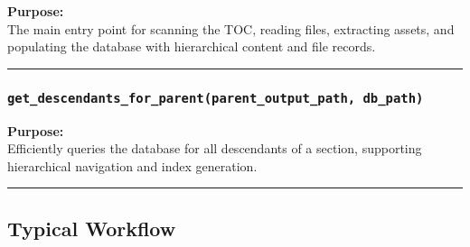 \textbf{Purpose:}\\
The main entry point for scanning the TOC, reading files, extracting
assets, and populating the database with hierarchical content and file
records.

\begin{center}\rule{0.5\linewidth}{0.5pt}\end{center}

\subsubsection{\texorpdfstring{\texttt{get\_descendants\_for\_parent(parent\_output\_path,\ db\_path)}}{get\_descendants\_for\_parent(parent\_output\_path, db\_path)}}\label{get_descendants_for_parentparent_output_path-db_path}

\begin{Shaded}
\begin{Highlighting}[]
\end{Highlighting}
\end{Shaded}

\textbf{Purpose:}\\
Efficiently queries the database for all descendants of a section,
supporting hierarchical navigation and index generation.

\begin{center}\rule{0.5\linewidth}{0.5pt}\end{center}

\subsection{Typical Workflow}\label{typical-workflow}

